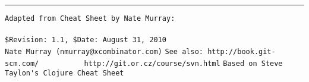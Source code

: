 \documentclass[twocolumn,landscape,10pt,a4paper]{article}
\begin{document}
\begin{flushright}
\footnotesize
\rule{0.7\linewidth}{0.25pt}
\verb!Adapted from Cheat Sheet by Nate Murray:          ! \\
\verb!! \\
\verb!$Revision: 1.1, $Date: August 31, 2010!\\
\verb!Nate Murray (nmurray@xcombinator.com)!
\verb!See also: http://book.git-scm.com/!
\verb!          http://git.or.cz/course/svn.html!
\verb!Based on Steve Taylon's Clojure Cheat Sheet!
\end{flushright}
\end{document}
